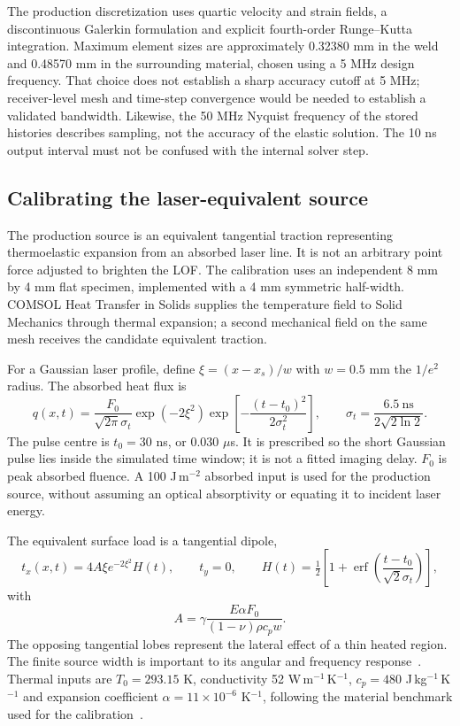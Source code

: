 The production discretization uses quartic velocity and strain fields, a discontinuous Galerkin formulation and explicit fourth-order Runge--Kutta integration. Maximum element sizes are approximately 0.32380 mm in the weld and 0.48570 mm in the surrounding material, chosen using a 5 MHz design frequency. That choice does not establish a sharp accuracy cutoff at 5 MHz; receiver-level mesh and time-step convergence would be needed to establish a validated bandwidth. Likewise, the 50 MHz Nyquist frequency of the stored histories describes sampling, not the accuracy of the elastic solution. The 10 ns output interval must not be confused with the internal solver step.

\subsection{Calibrating the laser-equivalent source}
\label{saftapp:calibration}
The production source is an equivalent tangential traction representing thermoelastic expansion from an absorbed laser line. It is not an arbitrary point force adjusted to brighten the LOF. The calibration uses an independent 8 mm by 4 mm flat specimen, implemented with a 4 mm symmetric half-width. COMSOL Heat Transfer in Solids supplies the temperature field to Solid Mechanics through thermal expansion; a second mechanical field on the same mesh receives the candidate equivalent traction.

For a Gaussian laser profile, define $\xi=(x-x_s)/w$ with $w=0.5$ mm the $1/e^2$ radius. The absorbed heat flux is
\begin{equation}
 q(x,t)=\frac{F_0}{\sqrt{2\pi}\sigma_t}
 \exp(-2\xi^2)\exp\!\left[-\frac{(t-t_0)^2}{2\sigma_t^2}\right],
 \qquad \sigma_t=\frac{6.5\ \mathrm{ns}}{2\sqrt{2\ln2}}.
\end{equation}
The pulse centre is $t_0=30$ ns, or 0.030 $\mu$s. It is prescribed so the short Gaussian pulse lies inside the simulated time window; it is not a fitted imaging delay. $F_0$ is peak absorbed fluence. A 100 J\,m$^{-2}$ absorbed input is used for the production source, without assuming an optical absorptivity or equating it to incident laser energy.

The equivalent surface load is a tangential dipole,
\begin{equation}
 t_x(x,t)=4A\xi e^{-2\xi^2}H(t),\qquad t_y=0,
 \qquad H(t)=\tfrac12\left[1+\operatorname{erf}\!\left(\frac{t-t_0}{\sqrt2\sigma_t}\right)\right],
\end{equation}
with
\begin{equation}
 A=\gamma\frac{E\alpha F_0}{(1-\nu)\rho c_p w}.
\end{equation}
The opposing tangential lobes represent the lateral effect of a thin heated region. The finite source width is important to its angular and frequency response~\cite{tu}. Thermal inputs are $T_0=293.15$ K, conductivity 52 W\,m$^{-1}$\,K$^{-1}$, $c_p=480$ J\,kg$^{-1}$\,K$^{-1}$ and expansion coefficient $\alpha=11\times10^{-6}$ K$^{-1}$, following the material benchmark used for the calibration~\cite{dolz-2024}.


